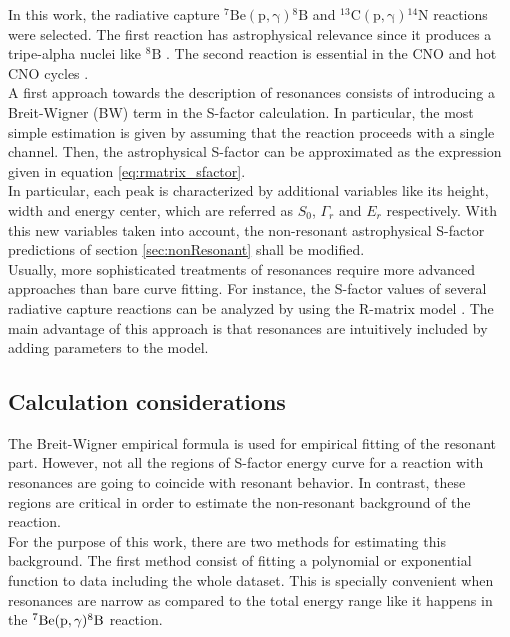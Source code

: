 \documentclass[openany]{book}
\begin{document}
In this work, the radiative capture $\mathrm{{}^{7}{Be}(p, \gamma){}^{8}{B} } $ and $\mathrm{{}^{13}{C}(p, \gamma){}^{14}{N}} $ reactions were selected. The first reaction has astrophysical relevance since it produces a tripe-alpha nuclei like $\mathrm{{}^{8}B}$ \cite{coc_2012}. The second reaction is essential in the CNO and hot CNO cycles \cite{wiescher_gorres_schatz_1999}. \\

A first approach towards the description of resonances consists of introducing a Breit-Wigner (BW) term in the S-factor calculation. In particular, the most simple estimation is given by assuming that the reaction proceeds with a single channel. Then, the astrophysical S-factor can be approximated as the expression given in equation \ref{eq:rmatrix_sfactor}. \\

In particular, each peak is characterized by additional variables like its height, width and energy center, which are referred as $S_0$, $\Gamma_r$ and $E_r$ respectively. With this new variables taken into account, the non-resonant astrophysical S-factor predictions of section \ref{sec:nonResonant} shall be modified.\\

Usually, more sophisticated treatments of resonances require more advanced approaches than bare curve fitting. For instance, the S-factor values of several radiative capture reactions can be analyzed by using the R-matrix model \cite{descouvemont_adahchour_angulo_coc_vangioni-flam_2004}. The main advantage of this approach is that resonances are intuitively included by adding parameters to the model.

\subsection{Calculation considerations} \label{sub:considerationsResonant}

The Breit-Wigner empirical formula is used for empirical fitting of the resonant part. However, not all the regions of S-factor energy curve for a reaction with resonances are going to coincide with resonant behavior. In contrast, these regions are critical in order to estimate the non-resonant background of the reaction.\\

For the purpose of this work, there are two methods for estimating this background. The first method consist of fitting a polynomial or exponential function to data including the whole dataset. This is specially convenient when resonances are narrow as compared to the total energy range like it happens in the $\mathrm{{}^{7}Be(p, \gamma){}^{8}B}$ reaction.  \\
\end{document}
